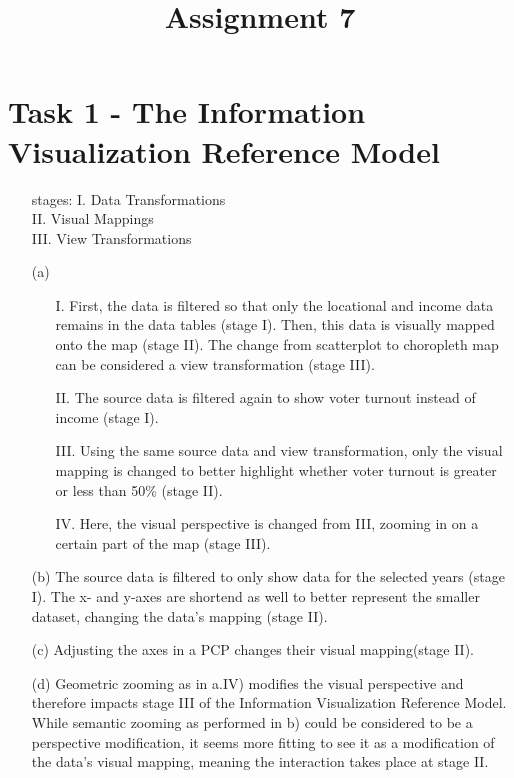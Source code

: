 \documentclass[a4paper]{article}
\date{}
\author{}
\title{\textbf{Assignment 7}}
\begin{document}
\maketitle 
\thispagestyle{fancy}

\section*{Task 1 - The Information Visualization Reference Model}
\begin{enumerate}

	\item[stages:] I. Data Transformations\\
	 II. Visual Mappings\\
	 III. View Transformations
	\item[(a)]
		\begin{enumerate}
			\item[I.] First, the data is filtered so that only the locational and income data remains in the data tables (stage I). Then, this data is visually mapped onto the map (stage II). The change from scatterplot to choropleth map can be considered  a view transformation (stage III).
			\item[II.] The source data is filtered again to show voter turnout instead of income (stage I).
			\item[III.] Using the same source data and view transformation, only the visual mapping is changed to better highlight whether voter turnout is greater or less than 50\% (stage II). 
			\item[IV.] Here, the visual perspective is changed from III, zooming in on a certain part of the map (stage III).
		\end{enumerate}
	\item[(b)] The source data is  filtered to only show data for the selected years (stage I). The x- and y-axes are shortend as well to better represent the smaller dataset, changing the data's mapping (stage II).
	\item[(c)] Adjusting the axes in a PCP changes their visual mapping(stage II).
	\item[(d)] Geometric zooming as in a.IV) modifies the visual perspective and therefore impacts stage III of the Information Visualization Reference Model. While semantic zooming as performed in b) could be considered to be a perspective modification, it seems more fitting to see it as a modification of the data's visual mapping, meaning the interaction takes place at stage II.
\end{enumerate}
\end{document}

